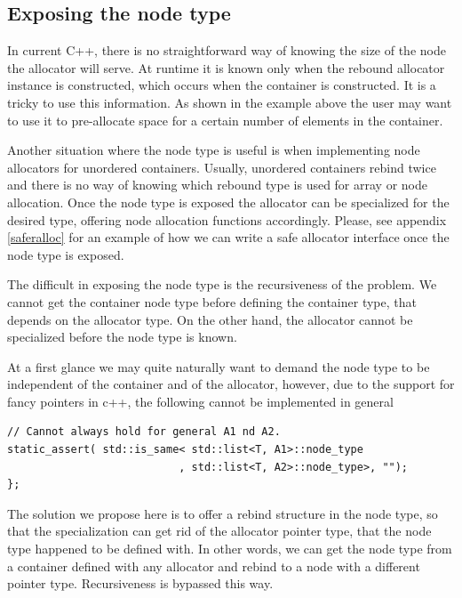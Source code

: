 \documentclass[11pt]{article}
\begin{document}
\subsection{Exposing the node type}

In current C++, there is no straightforward way of knowing the size of the node
the allocator will serve.  At runtime it is known only when the rebound
allocator instance is constructed, which occurs when the container is
constructed. It is a tricky to use this information. As shown in the example
above the user may want to use it to pre-allocate space for a
certain number of elements in the container.

Another situation where the node type is useful is when implementing node
allocators for unordered containers. Usually, unordered containers rebind
twice and there is no way of knowing which rebound type is used for array or
node allocation. Once the node type is exposed the allocator can be specialized
for the desired type, offering node allocation functions accordingly.
Please, see appendix \ref{saferalloc} for an example of how we can write a safe
allocator interface once the node type is exposed.

The difficult in exposing the node type is the recursiveness of the problem.  We
cannot get the container node type before defining the container type, that
depends on the allocator type. On the other hand, the allocator cannot be
specialized before the node type is known.

At a first glance we may quite naturally want to demand the node type to be independent
of the container and of the allocator, however, due to the support for fancy pointers
in c++, the following cannot be implemented in general
\begin{lstlisting}
// Cannot always hold for general A1 nd A2.
static_assert( std::is_same< std::list<T, A1>::node_type
                           , std::list<T, A2>::node_type>, "");
};
\end{lstlisting}

The solution we propose here is to offer a rebind structure in the node type,
so that the specialization can get rid of the allocator pointer type, that
the node type happened to be defined with.  In other words, we can get the
node type from a container defined with any allocator and rebind to a node
with a different pointer type. Recursiveness is bypassed this way.

%
\end{document}
